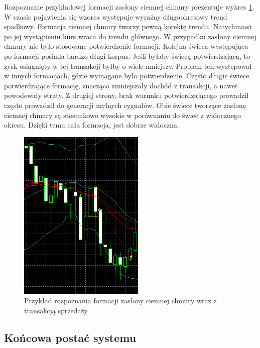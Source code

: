\documentclass[pdflatex,11pt]{aghdpl}
\begin{document}
Rozpoznanie przykładowej formacji zasłony ciemnej chmury prezentuje wykres \ref{przyklad_zaslona}. W czasie pojawienia się wzorca występuje wyraźny długookresowy trend spadkowy. Formacja ciemnej chmury tworzy pewną korektę trendu. Natychmiast po jej wystąpieniu kurs wraca do trendu głównego. W przypadku zasłony ciemnej chmury nie było stosowane potwierdzenie formacji. Kolejna świeca występująca po formacji posiada bardzo długi korpus. Jeśli byłaby świecą potwierdzającą, to zysk osiągnięty w tej transakcji byłby o wiele mniejszy. Problem ten występował w innych formacjach, gdzie wymagane było potwierdzenie. Często długie świece potwierdzające formację, znacząco zmniejszały dochód z transakcji, a nawet powodowały straty. Z drugiej strony, brak warunku potwierdzającego prowadził często prowadził do generacji mylnych sygnałów. Obie świece tworzące zasłonę ciemnej chmury są stosunkowo wysokie w porównaniu do świec z widocznego okresu. Dzięki temu cała formacja, jest dobrze widoczna.
\begin{figure}[h!]
\begin{center}
\includegraphics[width=6cm]{darkcloudcover/przyklad.png}
\caption{Przykład rozpoznania formacji zasłony ciemnej chmury wraz z transakcją sprzedaży}
\label{przyklad_zaslona}
\end{center}
\end{figure} 

\subsection{Końcowa postać systemu}
\paragraph{}
\end{document}
